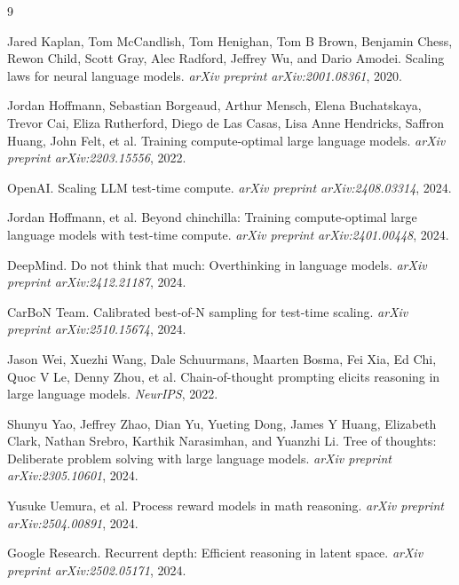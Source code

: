 \documentclass[10pt,preprint]{neurips_2024}
\begin{document}

\begin{thebibliography}{9}

Jared Kaplan, Tom McCandlish, Tom Henighan, Tom B Brown, Benjamin Chess, Rewon Child, Scott Gray, Alec Radford, Jeffrey Wu, and Dario Amodei.
\newblock Scaling laws for neural language models.
\newblock \emph{arXiv preprint arXiv:2001.08361}, 2020.

Jordan Hoffmann, Sebastian Borgeaud, Arthur Mensch, Elena Buchatskaya, Trevor Cai, Eliza Rutherford, Diego de Las Casas, Lisa Anne Hendricks, Saffron Huang, John Felt, et al.
\newblock Training compute-optimal large language models.
\newblock \emph{arXiv preprint arXiv:2203.15556}, 2022.

OpenAI.
\newblock Scaling LLM test-time compute.
\newblock \emph{arXiv preprint arXiv:2408.03314}, 2024.

Jordan Hoffmann, et al.
\newblock Beyond chinchilla: Training compute-optimal large language models with test-time compute.
\newblock \emph{arXiv preprint arXiv:2401.00448}, 2024.

DeepMind.
\newblock Do not think that much: Overthinking in language models.
\newblock \emph{arXiv preprint arXiv:2412.21187}, 2024.

CarBoN Team.
\newblock Calibrated best-of-N sampling for test-time scaling.
\newblock \emph{arXiv preprint arXiv:2510.15674}, 2024.

Jason Wei, Xuezhi Wang, Dale Schuurmans, Maarten Bosma, Fei Xia, Ed Chi, Quoc V Le, Denny Zhou, et al.
\newblock Chain-of-thought prompting elicits reasoning in large language models.
\newblock \emph{NeurIPS}, 2022.

Shunyu Yao, Jeffrey Zhao, Dian Yu, Yueting Dong, James Y Huang, Elizabeth Clark, Nathan Srebro, Karthik Narasimhan, and Yuanzhi Li.
\newblock Tree of thoughts: Deliberate problem solving with large language models.
\newblock \emph{arXiv preprint arXiv:2305.10601}, 2024.

Yusuke Uemura, et al.
\newblock Process reward models in math reasoning.
\newblock \emph{arXiv preprint arXiv:2504.00891}, 2024.

Google Research.
\newblock Recurrent depth: Efficient reasoning in latent space.
\newblock \emph{arXiv preprint arXiv:2502.05171}, 2024.


\end{thebibliography}
\end{document}
